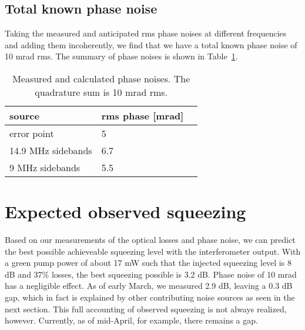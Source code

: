 \documentclass{ligodoc}
\begin{document}






\subsection{Total known phase noise}
Taking the measured and anticipated rms phase noises at different
frequencies and adding them incoherently, we find that we have a total
known phase noise of 10 mrad rms. The summary of phase noises is shown
in Table~\ref{tab:phasenoises}.

\begin{table}
\centering
\caption{Measured and calculated phase noises. The quadrature sum is 10 mrad rms.}
\begin{tabular}{l l l}
\hline
source & rms phase [mrad]\\
\hline
error point & 5 \\
14.9 MHz sidebands & 6.7 \\
9 MHz sidebands & 5.5 \\
\hline
\end{tabular}
\label{tab:phasenoises}
\end{table}



\section{Expected observed squeezing}
Based on our measurements of the optical losses and phase noise, we
can predict the best possible achieveable squeezing level with the
interferometer output. With a green pump power of about 17 mW such
that the injected squeezing level is 8 dB and 37\% losses, the best
squeezing possible is 3.2 dB. Phase noise of 10 mrad has a negligible
effect. As of early March, we measured 2.9 dB, leaving a 0.3 dB gap,
which in fact is explained by other contributing noise sources as seen
in the next section. This full accounting of observed squeezing is not
always realized, however. Currently, as of mid-April, for example,
there remains a gap.
\end{document}
